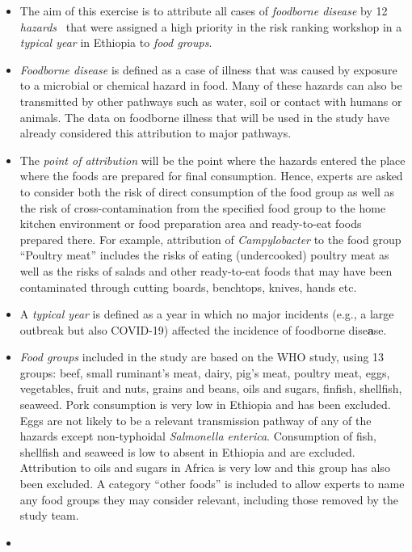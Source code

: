 \documentclass[
  letterpaper,
  DIV=11,
  numbers=noendperiod]{scrartcl}
\begin{document}
\begin{itemize}
\item
  The aim of this exercise is to attribute all cases of \emph{foodborne
  disease} by 12 \emph{hazards}~ that were assigned a high priority in
  the risk ranking workshop in a \emph{typical year} in Ethiopia to
  \emph{food groups}.
\item
  \emph{Foodborne disease} is defined as a case of illness that was
  caused by exposure to a microbial or chemical hazard in food. Many of
  these hazards can also be transmitted by other pathways such as water,
  soil or contact with humans or animals. The data on foodborne illness
  that will be used in the study have already considered this
  attribution to major pathways.
\item
  The \emph{point of attribution} will be the point where the hazards
  entered the place where the foods are prepared for final consumption.
  Hence, experts are asked to consider both the risk of direct
  consumption of the food group as well as the risk of
  cross-contamination from the specified food group to the home kitchen
  environment or food preparation area and ready-to-eat foods prepared
  there. For example, attribution of \emph{Campylobacter} to the food
  group ``Poultry meat'' includes the risks of eating (undercooked)
  poultry meat as well as the risks of salads and other ready-to-eat
  foods that may have been contaminated through cutting boards,
  benchtops, knives, hands etc.
\item
  A \emph{typical year} is defined as a year in which no major incidents
  (e.g., a large outbreak but also COVID-19) affected the incidence of
  foodborne dise\textbf{a}se.
\item
  \emph{Food groups} included in the study are based on the WHO study,
  using 13 groups: beef, small ruminant's meat, dairy, pig's meat,
  poultry meat, eggs, vegetables, fruit and nuts, grains and beans, oils
  and sugars, finfish, shellfish, seaweed. Pork consumption is very low
  in Ethiopia and has been excluded. Eggs are not likely to be a
  relevant transmission pathway of any of the hazards except
  non-typhoidal \emph{Salmonella enterica}. Consumption of fish,
  shellfish and seaweed is low to absent in Ethiopia and are excluded.
  Attribution to oils and sugars in Africa is very low and this group
  has also been excluded. A category ``other foods'' is included to
  allow experts to name any food groups they may consider relevant,
  including those removed by the study team.
\item

\end{itemize}
\end{document}
